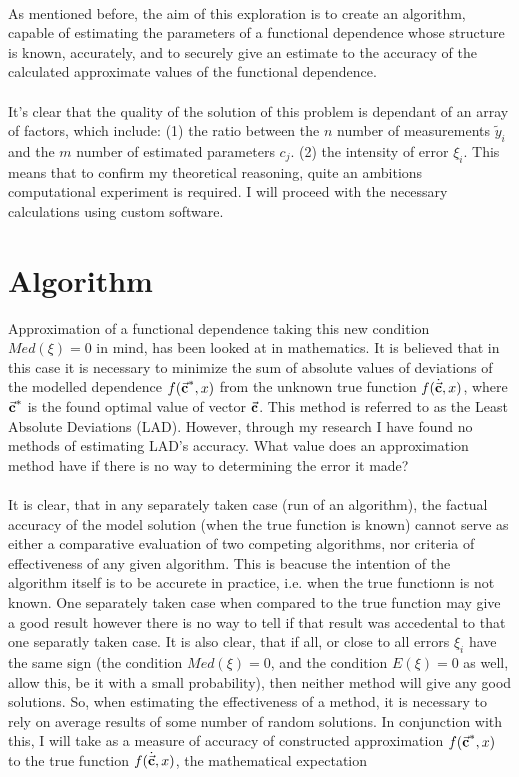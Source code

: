 \\
As mentioned before, the aim of this exploration is to create an algorithm, capable of estimating the parameters of a functional dependence whose structure is known, accurately,  and to securely give an estimate to the accuracy of the calculated approximate values of the functional dependence. \\
\\
It's clear that the quality of the solution of this problem is dependant of an array of factors, which include: (1) the ratio between the $n$ number of measurements $\tilde{y}_{i}$ and the $m$ number of estimated parameters $c_{j}$. (2) the intensity of error $\xi_{i}$. This means that to confirm my theoretical reasoning, quite an ambitions computational experiment is required. I will proceed with the necessary calculations using custom software. 

\section{Algorithm}

Approximation of a functional dependence taking this new condition $Med(\xi)=0$ in mind, has been looked at in mathematics. \cite{balk_2010} It is believed that in this case it is necessary to minimize the sum of absolute values of deviations of the modelled dependence $f(\vec{\textbf{c}}^{*},x)$ from the unknown true function $f(\dot{\vec{\textbf{c}}},x)$, where $\vec{\textbf{c}}^{*}$ is the found optimal value of  vector $\vec{\textbf{c}}$. This method is referred to as the Least Absolute Deviations (LAD). However, through my research I have found no methods of estimating LAD's accuracy. What value does an approximation method have if there is no way to determining the error it made?\\
\\
It is clear, that in any separately taken case (run of an algorithm), the factual accuracy of the model solution (when the true function is known) cannot serve as either a comparative evaluation of two competing algorithms, nor criteria of effectiveness of any given algorithm. This is beacuse the intention of the algorithm itself is to be accurete in practice, i.e. when the true functionn is not known. One separately taken case when compared to the true function may give a good result however there is no way to tell if that result was accedental to that one separatly taken case. It is also clear, that if all, or close to all errors $\xi_{i}$ have the same sign (the condition $Med(\xi)=0$, and the condition $E(\xi)=0$ as well, allow this, be it with a small probability), then neither method will give any good solutions. So, when estimating the effectiveness of a method, it is necessary to rely on average results of some number of random solutions. In conjunction with this, I will take as a measure of accuracy of constructed approximation $f(\vec{\textbf{c}}^{*},x)$ to the true function $f(\dot{\vec{\textbf{c}}},x)$, the mathematical expectation  \cite{Ross_2007}

